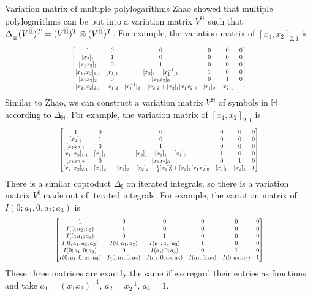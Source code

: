 \documentclass[8pt]{beamer}
\theoremstyle{definition}
\theoremstyle{remark}
\begin{document}
\begin{frame}[t]{Variation matrix of multiple polylogarithms}
Zhao showed that multiple polylogarithms can be put into a variation matrix $V^{\overline{\mathbb H}}$ such that $\Delta_{\over{\mathbb H}}(V^{\overline{\mathbb H}})^T=(V^{\overline{\mathbb H}})^T\otimes(V^{\overline{\mathbb H}})^T$. For example, the variation matrix of $[x_1,x_2]_{2,1}$ is
\begin{equation}
\scalebox{.7}{$
\begin{bmatrix}
1&0&0&0&0&0\\
[x_2]_1&1&0&0&0&0\\
[x_1x_2]_1&0&1&0&0&0\\
[x_1,x_2]_{1,1}&[x_1]_1&[x_2]_1-[x_1^{-1}]_1&1&0&0\\
[x_1x_2]_2&0&[x_1x_2]_0&0&1&0\\
[x_2,x_2]_{2,1}&[x_1]_2&[x_1^{-1}]_2-[x_2]_2+[x_2]_1[x_1x_2]_0&[x_1]_0&[x_2]_1&1
\end{bmatrix}
$}
\end{equation}
Similar to Zhao, we can construct a variation matrix $V^{\mathbb H}$ of symbols in $\mathbb H$ according to $\Delta_{\mathbb H}$. For example, the variation matrix of $[x_1,x_2]_{2,1}$ is
\begin{equation}
\scalebox{.7}{$
\begin{bmatrix}
1&0&0&0&0&0\\
[x_2]_1&1&0&0&0&0\\
[x_1x_2]_1&0&1&0&0&0\\
[x_1,x_2]_{1,1}&[x_1]_1&[x_2]_1-[x_1]_1-[x_1]_0&1&0&0\\
[x_1x_2]_2&0&[x_1x_2]_0&0&1&0\\
[x_2,x_2]_{2,1}&[x_1]_2&-[x_1]_2-[x_2]_2-\frac{1}{2}[x_1]_0^2+[x_2]_1[x_1x_2]_0&[x_1]_0&[x_2]_1&1
\end{bmatrix}
$}
\end{equation}
There is a similar coproduct $\Delta_{\mathbb I}$ on iterated integrals, so there is a variation matrix $V^{\mathbb I}$ made out of iterated integrals. For example, the variation matrix of $I(0;a_1,0,a_2;a_3)$ is
\begin{equation}
\scalebox{.7}{$
\begin{bmatrix}
1&0&0&0&0&0\\
I(0;a_2;a_3)&1&0&0&0&0\\
I(0;a_1;a_3)&0&1&0&0&0\\
I(0;a_1,a_2;a_3)&I(0;a_1;a_2)&I(a_1;a_2;a_3)&1&0&0\\
I(0;a_1,0;a_3)&0&I(a_1;0;a_3)&0&1&0\\
I(0;a_1,0,a_2;a_3)&I(0;a_1,0;a_2)&I(a_1;0,a_2;a_3)&I(a_1;0;a_2)&I(0;a_2;a_3)&1
\end{bmatrix}
$}
\end{equation}
These three matrices are exactly the same if we regard their entries as functions and take $a_1=(x_1x_2)^{-1}$, $a_2=x_2^{-1}$, $a_3=1$.
\end{frame}
\end{document}
